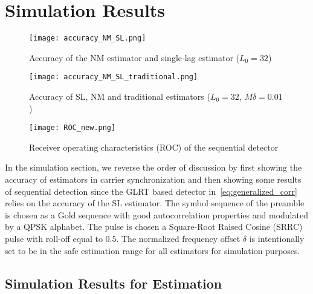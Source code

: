 \section{Simulation Results}%
\label{sec:simulations}

\begin{figure}[t]
    \centerline{\texttt{[image: accuracy\_NM\_SL.png]}}
    \caption{Accuracy of the NM estimator and single-lag estimator ($L_0=32$)}%
    \label{fig:accuracy_NM_SL}
    \end{figure}

\begin{figure}[t]
    \centerline{\texttt{[image: accuracy\_NM\_SL\_traditional.png]}}
    \caption{Accuracy of SL, NM and traditional estimators ($L_0=32$, $M\delta=0.01$)}%
    \label{fig:accuracy_NM_SL_traditional}
    \end{figure}

\begin{figure}[t]
    \centerline{\texttt{[image: ROC\_new.png]}}
    \caption{Receiver operating characteristics (ROC) of the sequential detector}%
    \label{fig:Receiver operating characteristics}
    \end{figure}

In the simulation section, we reverse the order of discussion by first showing 
the accuracy of estimators in carrier synchronization and then showing some results of sequential detection since
the GLRT based detector in~\eqref{eq:generalized_corr} relies on the accuracy of 
the SL estimator.
The symbol sequence of the preamble is chosen as a Gold sequence 
with good autocorrelation properties and
modulated by a QPSK alphabet.
The pulse is chosen a
Square-Root Raised Cosine (SRRC) pulse with roll-off equal to 0.5.
The normalized frequency offset $\delta$ is intentionally set to be in
the safe estimation range for all estimators for simulation purposes. 

\subsection{Simulation Results for Estimation}%


